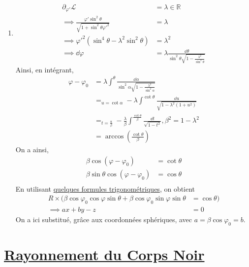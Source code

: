 \documentclass[a4paper,10pt]{report}
\begin{document}
\begin{enumerate}
	\item \begin{align*}
\partial_{\varphi'} \mathcal L &= \lambda \in \mathbb{R}\\
\implies \frac{\varphi' \sin^2\theta}{\sqrt{1+\sin^2\theta \varphi'^2}} &= \lambda \\
\implies \varphi'^2(\sin^4\theta - \lambda^2\sin^2\theta) &=\lambda^2\\
\implies \dd\varphi &= \lambda \frac{\dd\theta}{\sin^2\theta \sqrt{1-\frac {\lambda^2}{\sin^2\theta}}}
	\end{align*}
Ainsi, en intégrant,
	\begin{align*}
		\varphi - \varphi_0 &= \lambda \int^\theta \frac{\dd \alpha}{\sin^2 \alpha \sqrt{1-\frac {\lambda^2} {\sin^2 \alpha}}}\\
		&=_{u = \cot \alpha} - \lambda \int^{\cot \theta} \frac{\dd u}{\sqrt{1 - \lambda^2(1+u^2)}}\\
		&=_{t = \frac u \beta} - \frac \lambda \beta  \int^{\frac{\cot \theta} \beta} \frac{\dd t}{\sqrt{1-t^2}}, \beta^2 = 1-\lambda^2\\
		&= \arccos(\frac{\cot \theta}{\beta})
	\end{align*}
	On a ainsi, \begin{align*}
		\beta \cos(\varphi - \varphi_0) &= \cot \theta \\
		\beta \sin \theta \cos(\varphi - \varphi_0) &= \cos \theta \\
	\end{align*}
	En utilisant \hyperref[subsubsec:trigo]{quelques formules trigonométriques}, on obtient
	\begin{align*}
 R\times (\beta \cos \varphi_0 \cos \varphi \sin \theta + \beta \cos \varphi_0 \sin \varphi \sin \theta &= \cos \theta)\\
 \implies a x + by -z &=0
	\end{align*}
	On a ici substitué, grâce aux coordonnées sphériques, avec $a = \beta \cos\varphi_0 = b$.
	\end{enumerate}
	
	
	\newpage \section{\hyperref[subsec:CorpsNoir]{Rayonnement du Corps Noir}}\label{subsec:correctionCorpsNoir}
\end{document}
